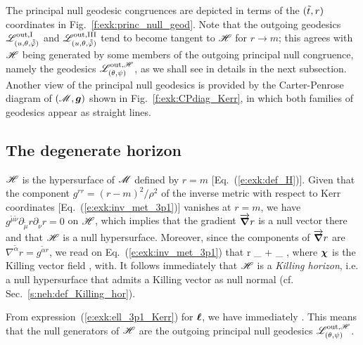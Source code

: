 The principal null geodesic congruences are depicted in terms of the $({\tilde t}, r)$
coordinates in Fig.~\ref{f:exk:princ_null_geod}. Note that the outgoing geodesics
$\mathscr{L}^{\rm out, I}_{(u,\theta,\tilde{{\tilde\varphi}})}$ and $\mathscr{L}^{\rm out, III}_{(u,\theta,\tilde{{\tilde\varphi}})}$
tend to become tangent to $\mathscr{H}$ for $r\to m$; this agrees with $\mathscr{H}$ being
generated by some members of the outgoing principal null congruence, namely the geodesics
$\mathscr{L}^{{\rm out},\mathscr{H}}_{(\theta,\psi)}$, as we shall see in details in the next subsection.
Another view of the principal null geodesics is provided by the Carter-Penrose
diagram of $(\mathscr{M},\bm{g})$ shown in Fig.~\ref{f:exk:CPdiag_Kerr}, in which both
families of geodesics appear as straight lines.

\subsection{The degenerate horizon} \label{s:exk:horizon}

$\mathscr{H}$ is the hypersurface of $\mathscr{M}$ defined by $r=m$ [Eq.~(\ref{e:exk:def_H})]. Given
that the component $g^{rr} = (r - m)^2/\rho^2$ of the inverse metric with respect to Kerr coordinates
[Eq.~(\ref{e:exk:inv_met_3p1})] vanishes at $r=m$, we have
$g^{\tilde{\mu}\tilde{\nu}} \partial_{\tilde{\mu}} r \partial_{\tilde{\nu}} r = 0$ on $\mathscr{H}$,
which implies that the gradient $\overrightarrow{\bm{\nabla}} r$
is a null vector there and that $\mathscr{H}$ is a null hypersurface.
Moreover, since the components of $\overrightarrow{\bm{\nabla}} r$ are $\nabla^{\tilde{\alpha}} r = g^{\tilde{\alpha}r}$,
we read on Eq.~(\ref{e:exk:inv_met_3p1}) that
\be
    \vw{\nabla} r \equalH {} \wpar_{\ti} +  \wpar_{\tph}
        \equalH {} \w{\chi} ,
\ee
where $\bm{\chi}$ is the Killing vector field
\be \label{e:exk:def_chi}
    ,
    \qquad\mbox{with}\quad {}.
\ee
It follows immediately that $\mathscr{H}$ is a \emph{Killing horizon}, i.e. a null hypersurface
that admits a Killing vector as null normal (cf. Sec.~\ref{s:neh:def_Killing_hor}).

From expression~(\ref{e:exk:ell_3p1_Kerr}) for $\bm{\ell}$, we have immediately
\be \label{e:exk:ell_chi_on_H}
    \wl \equalH \w{\chi} .
\ee
This means that the null generators of $\mathscr{H}$ are the outgoing principal null
geodesics $\mathscr{L}^{{\rm out},\mathscr{H}}_{(\theta,\psi)}$.

